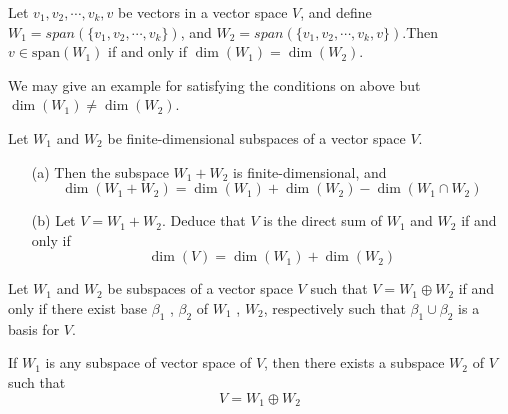 \begin{thm} %
Let $v_1, v_2, \cdots , v_k, v$ be vectors in a vector space $V$, and define $W_1 = span(\{v_1, v_2, \cdots , v_k\})$, and $W_2 = span(\{v_1, v_2, \cdots , v_k , v \})$.Then $v \in \mathrm{span}(W_1)$ if and only if $\dim(W_1) = \dim(W_2)$.
\end{thm}

%


\begin{rmk*}
	We may give an example for satisfying the conditions on above but $\dim(W_1) \neq \dim(W_2)$.
\end{rmk*}


\begin{thm} %
Let $W_1$ and $W_2$ be finite-dimensional subspaces of a vector space $V$.
\begin{enumerate} 
	\item [(a)]Then the subspace $W_1 + W_2$ is finite-dimensional, and $$\dim(W_1 + W_2) = \dim(W_1) + \dim(W_2) - \dim(W_1 \cap W_2)$$
    \item [(b)]  Let $V = W_1 + W_2$. Deduce that $V$ is the direct sum of $W_1$ and $W_2$ if and only if $$\dim(V) = \dim(W_1) + \dim(W_2)$$
\end{enumerate}	
\end{thm}




\begin{thm} %
Let $W_1$ and $W_2$ be subspaces of a vector space $V$ such that $V = W_1 \oplus W_2$ if and only if there exist base $\beta_1$ , $\beta_2$ of $W_1$ , $W_2$, respectively such that $\beta_1 \cup \beta_2$ is a basis for $V$.
\end{thm}




\begin{thm} %
		\item If $W_1$ is any subspace of vector space of $V$, then there exists a subspace $W_2$ of $V$ such that $$ V = W_1 \oplus W_2 $$
\end{thm}


         